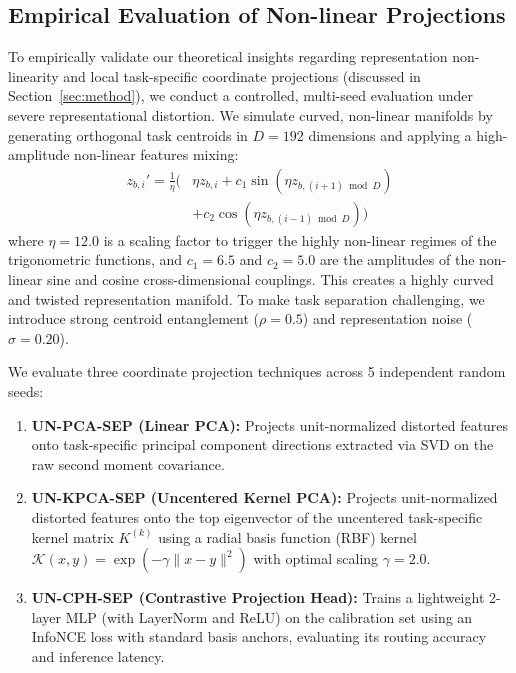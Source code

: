 \subsection{Empirical Evaluation of Non-linear Projections}
\label{sec:nonlinear_eval}
To empirically validate our theoretical insights regarding representation non-linearity and local task-specific coordinate projections (discussed in Section~\ref{sec:method}), we conduct a controlled, multi-seed evaluation under severe representational distortion. We simulate curved, non-linear manifolds by generating orthogonal task centroids in $D=192$ dimensions and applying a high-amplitude non-linear features mixing:
\begin{equation}
\begin{split}
z_{b, i}' = \frac{1}{\eta} \Big( &\eta z_{b, i} + c_1 \sin(\eta z_{b, (i+1) \bmod D}) \\
&+ c_2 \cos(\eta z_{b, (i-1) \bmod D}) \Big)
\end{split}
\end{equation}
where $\eta = 12.0$ is a scaling factor to trigger the highly non-linear regimes of the trigonometric functions, and $c_1 = 6.5$ and $c_2 = 5.0$ are the amplitudes of the non-linear sine and cosine cross-dimensional couplings. This creates a highly curved and twisted representation manifold. To make task separation challenging, we introduce strong centroid entanglement ($\rho = 0.5$) and representation noise ($\sigma = 0.20$).

We evaluate three coordinate projection techniques across 5 independent random seeds:
\begin{enumerate}
    \item \textbf{UN-PCA-SEP (Linear PCA):} Projects unit-normalized distorted features onto task-specific principal component directions extracted via SVD on the raw second moment covariance.
    \item \textbf{UN-KPCA-SEP (Uncentered Kernel PCA):} Projects unit-normalized distorted features onto the top eigenvector of the uncentered task-specific kernel matrix $K^{(k)}$ using a radial basis function (RBF) kernel $\mathcal{K}(x, y) = \exp(-\gamma \|x - y\|^2)$ with optimal scaling $\gamma = 2.0$.
    \item \textbf{UN-CPH-SEP (Contrastive Projection Head):} Trains a lightweight 2-layer MLP (with LayerNorm and ReLU) on the calibration set using an InfoNCE loss with standard basis anchors, evaluating its routing accuracy and inference latency.
\end{enumerate}

